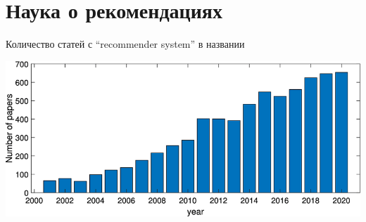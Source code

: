 \documentclass[11pt,aspectratio=169,handout]{beamer}
\begin{document}
\section{Наука о рекомендациях}

{
\begin{frame}[plain]
\end{frame}
}

\begin{frame}{Количество статей с ``recommender system'' в названии}
\begin{center}
\includegraphics[scale=1.5]{images/publications.png}
\end{center}
\end{frame}
\end{document}
